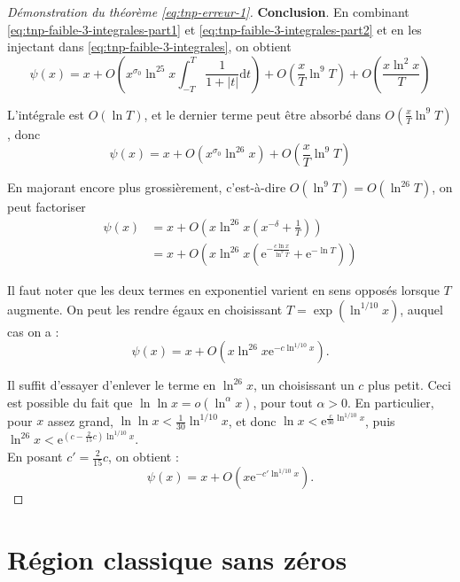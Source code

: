 \documentclass[french]{report}
\begin{document}
\begin{proof}[Démonstration du théorème \ref{eq:tnp-erreur-1}]
  \textbf{Conclusion}. En combinant \ref{eq:tnp-faible-3-integrales-part1} et \ref{eq:tnp-faible-3-integrales-part2} et en les injectant dans \ref{eq:tnp-faible-3-integrales}, on obtient
  \[ \psi(x) = x
  + O\left(x^{\sigma_0}\ln^{25}x\int_{-T}^T\frac{1}{1+|t|}\mathrm{d}t\right)
  + O\left(\frac{x}{T}\ln^9T\right)
  + O\left(\frac{x\ln^2x}{T}\right)
  \]

  L'intégrale est $O(\ln T)$, et le dernier terme peut être absorbé dans $O\left(\frac{x}{T}\ln^9T\right)$, donc
  \[ \psi(x) = x + O(x^{\sigma_0}\ln^{26}x) + O\left(\frac{x}{T}\ln^9T\right) \]

  En majorant encore plus grossièrement, c'est-à-dire $O(\ln^9 T) = O(\ln^{26} T)$, on peut factoriser
  \begin{align*}
    \psi(x) &= x + O\left(x\ln^{26} x\left(x^{-\delta}+\frac{1}{T}\right)\right) \\
    &= x + O\left(x\ln^{26} x\left(\mathrm{e}^{-\frac{c\ln x}{\ln^9 T}}+\mathrm{e}^{-\ln T}\right)\right)
  \end{align*}

  Il faut noter que les deux termes en exponentiel varient en sens opposés lorsque $T$ augmente. On peut les rendre égaux en choisissant $T=\exp(\ln^{1/10}x)$, auquel cas on a :
  \[
    \psi(x) = x + O(x\ln^{26} x\mathrm{e}^{-c\ln^{1/10}x}).
  \]

  Il suffit d'essayer d'enlever le terme en $\ln^{26} x$, un choisissant un $c$ plus petit. Ceci est possible du fait que $\ln\ln x = o(\ln^\alpha x)$, pour tout $\alpha>0$. En particulier, pour $x$ assez grand, $\ln\ln x < \frac{1}{30}\ln^{1/10} x$, et donc $\ln x < \mathrm{e}^{\frac{c}{30}\ln^{1/10}x}$, puis $\ln^{26} x < \mathrm{e}^{(c-\frac{2}{15}c)\ln^{1/10}x}$.
  \\

  En posant $c'=\frac{2}{15}c$, on obtient :
  \[ \psi(x) = x + O(x\mathrm{e}^{-c'\ln^{1/10}x}). \]
\end{proof}

\section{Région classique sans zéros}\label{section:region-classique}
\end{document}
